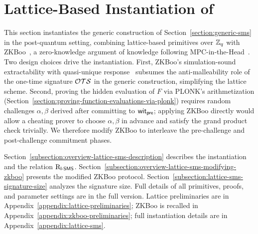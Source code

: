 \section{Lattice-Based Instantiation of \SMS}
\label{section:overview-lattice-sms}

This section instantiates the generic \SMS construction of
Section~\ref{section:generic-sms} in the post-quantum setting,
combining lattice-based primitives over $\mathbb{Z}_q$ with ZKBoo~\cite{USENIX:GiaMadOrl16},
a zero-knowledge argument of knowledge following MPC-in-the-Head~\cite{STOC:IKOS07}.
Two design choices drive the instantiation.
First, ZKBoo's simulation-sound extractability with quasi-unique
response~\cite{INDOCRYPT:FKMV12} subsumes the anti-malleability role
of the one-time signature $\mathcal{OTS}$ in the generic construction,
simplifying the lattice scheme.
Second, proving the hidden evaluation of $F$ via PLONK's arithmetization
(Section~\ref{section:proving-function-evaluations-via-plonk})
requires random challenges $\alpha, \beta$ derived after committing to $\mathsf{wit}_\mathsf{pre}$;
applying ZKBoo directly would allow a cheating prover to choose $\alpha, \beta$
in advance and satisfy the grand product check trivially.
We therefore modify ZKBoo to interleave the pre-challenge and post-challenge
commitment phases.

Section~\ref{subsection:overview-lattice-sms-description} describes
the instantiation and the relation $\mathrm{R}_{\mathsf{l}\textsf{-}\mathsf{SMS}}$.
Section~\ref{subsection:overview-lattice-sms-modifying-zkboo} presents
the modified ZKBoo protocol.
Section~\ref{subsection:lattice-sms-signature-size} analyzes the signature size.
\ifcameraready
Full details of all primitives, proofs, and parameter settings
are in the full version.
\else
Lattice preliminaries are in Appendix~\ref{appendix:lattice-preliminaries};
ZKBoo is recalled in Appendix~\ref{appendix:zkboo-preliminaries};
full instantiation details are in Appendix~\ref{appendix:lattice-sms}.
\fi



